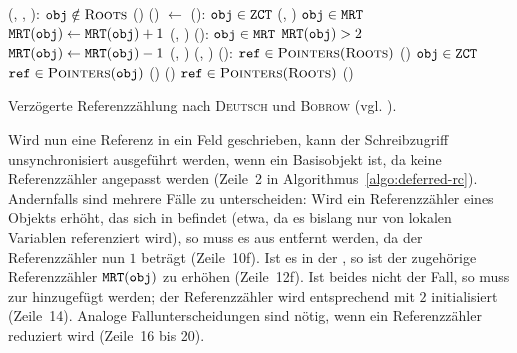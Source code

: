 \begin{algorithm}[h]
\begin{algorithmic}[1]
	\State {}(, , ):
	\State \quad \IF $\texttt{obj} \notin \textsc{Roots}$		
	\State \quad \quad \Atomic
	\State \quad \quad \quad {}()
	\State \quad \quad \quad {}()
	\State \quad {} $\gets$ 
	\Statex
	\State {}():
	\State \quad \IF $\texttt{obj} \in \texttt{ZCT}$
	\State \quad \quad {}(, )	
	\State \quad \ELSE \IF $\texttt{obj} \in \texttt{MRT}$
	\State \quad \quad $\texttt{MRT}(\texttt{obj}) \gets \texttt{MRT}(\texttt{obj}) + 1$	
	\State \quad \ELSE {}(, )		
	\Statex
	\State {}():
	\State \quad \IF $\texttt{obj} \in \texttt{MRT}$
	\State \quad \quad \IF $\texttt{MRT}(\texttt{obj}) > 2$
	\State \quad \quad \quad $\texttt{MRT}(\texttt{obj}) \gets \texttt{MRT}(\texttt{obj}) - 1$	
	\State \quad \quad \ELSE {}(, )	
	\State \quad \ELSE {}(, )			
	\Statex
	\State \Atomic {}():
	\State \quad \FOREACH $\texttt{ref} \in \textsc{Pointers}(\textsc{Roots})$		
	\State \quad \quad {}()
	\State \quad \FOREACH $\texttt{obj} \in \texttt{ZCT}$
	\State \quad \quad \FOREACH $\texttt{ref} \in \textsc{Pointers}(\texttt{obj})$
	\State \quad \quad \quad {}()
	\State \quad \quad {}()
	\State \quad \FOREACH $\texttt{ref} \in \textsc{Pointers}(\textsc{Roots})$		
	\State \quad \quad {}()
\end{algorithmic}
\caption[Verzögerte Referenzzählung nach \textsc{Deutsch} und \textsc{Bobrow}]{Verzögerte Referenzzählung nach \textsc{Deutsch} und \textsc{Bobrow} (vgl. \cite[S. 523f]{deutsch1976}).}
\label{algo:deferred-rc}
\end{algorithm}

Wird nun eine Referenz  in ein Feld  geschrieben, kann der Schreibzugriff unsynchronisiert ausgeführt werden, wenn  ein Basisobjekt ist, da keine Referenzzähler angepasst werden (Zeile~2 in Algorithmus~\ref{algo:deferred-rc}).
Andernfalls sind mehrere Fälle zu unterscheiden:
Wird ein Referenzzähler eines Objekts  erhöht, das sich in  befindet (etwa, da es bislang nur von lokalen Variablen referenziert wird), so muss es aus  entfernt werden, da der Referenzzähler nun $1$ beträgt (Zeile~10f).
Ist es in der , so ist der zugehörige Referenzzähler $\texttt{MRT}(\texttt{obj})$ zu erhöhen (Zeile~12f).
Ist beides nicht der Fall, so muss  zur  hinzugefügt werden; der Referenzzähler wird entsprechend mit $2$ initialisiert (Zeile~14).
Analoge Fallunterscheidungen sind nötig, wenn ein Referenzzähler reduziert wird (Zeile~16 bis 20).

